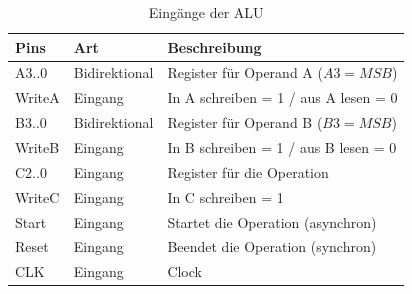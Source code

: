 \begin{table}[H]
  \begin{tabular}{|p{1.5cm}|p{2.5cm}|p{7.4592cm}|}
    \hline
    \textbf{Pins} & \textbf{Art}  & \textbf{Beschreibung}                \\
    \hline
    A3..0         & Bidirektional & Register für Operand A ($A3 = MSB$)  \\
    WriteA        & Eingang       & In A schreiben = 1 / aus A lesen = 0 \\
    \hline
    B3..0         & Bidirektional & Register für Operand B ($B3 = MSB$)  \\
    WriteB        & Eingang       & In B schreiben = 1 / aus B lesen = 0 \\
    \hline
    C2..0         & Eingang       & Register für die Operation           \\
    WriteC        & Eingang       & In C schreiben = 1                   \\
    \hline
    Start         & Eingang       & Startet die Operation (asynchron)    \\
    \hline
    Reset         & Eingang       & Beendet die Operation (synchron)     \\
    \hline
    CLK           & Eingang       & Clock                                \\
    \hline
  \end{tabular}
  \caption{Eingänge der ALU}
  \label{fig:Eingänge der ALU}
\end{table}

